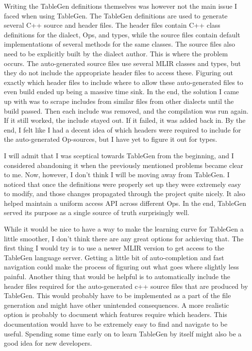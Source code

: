 Writing the TableGen definitions themselves was however not the main issue I faced when using TableGen. The TableGen definitions are used to generate several C++ source and header files. The header files contain C++ class definitions for the dialect, Ops, and types, while the source files contain default implementations of several methods for the same classes. The source files also need to be explicitly built by the dialect author. This is where the problem occurs. The auto-generated source files use several MLIR classes and types, but they do not include the appropriate header files to access these. Figuring out exactly which header files to include where to allow these auto-generated files to even build ended up being a massive time sink. In the end, the solution I came up with was to scrape includes from similar files from other dialects until the build passed. Then each include was removed, and the compilation was run again. If it still worked, the include stayed out. If it failed, it was added back in. By the end, I felt like I had a decent idea of which headers were required to include for the auto-generated Op-sources, but I have yet to figure it out for types.

I will admit that I was sceptical towards TableGen from the beginning, and I considered abandoning it when the previously mentioned problems became clear to me. Now, however, I don't think I will be moving away from TableGen. I noticed that once the definitions were properly set up they were extremely easy to modify, and those changes propagated through the project quite nicely. It also helped maintain a uniform access API across different Ops. In the end, TableGen served its purpose as a single source of truth surprisingly well. 


While it would be nice to have a way to make the learning curve for TableGen a little smoother, I don't think there are any great options for achieving that. The first thing I would try is to use a newer MLIR version to get access to the TableGen language server. Getting a little bit of auto-completion and fast navigation could make the process of figuring out what goes where slightly less painful. Another thing that would be helpful is to automatically include the header files required for the auto-generated c++ source files that are produced by TableGen. This would probably have to be implemented as a part of the file generation and might have other unintended consequences. A more realistic option is probably to document which features require which headers. This documentation would have to be extremely easy to find and navigate to be useful. Spending some time early on to learn TableGen by itself might also be a good idea for new developers.
